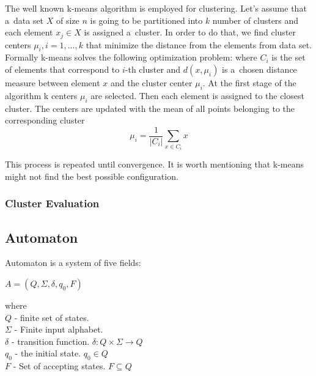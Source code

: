 \documentclass{article}
\begin{document}
The well known k-means algorithm is employed for clustering. Let's assume that a~data set $X$ of size $n$ is going to be partitioned into $k$ number of clusters and each element $x_{j}\in X$ is assigned a~cluster. In order to do that, we find cluster centers $\mu_{i}, i=1,\ldots,k$ that minimize the distance from the elements from data set. Formally k-means solves the following optimization problem:
where $C_{i}$ is the set of elements that correspond to $i$-th cluster and $d(x,\mu_{i})$ is a~chosen distance measure between element $x$ and the cluster center $\mu_{i}$. At the first stage of the algorithm k centers $\mu_{i}$ are selected. Then each element is assigned to the closest cluster. The centers are updated with the mean of all points belonging to the corresponding cluster
\begin{equation}
  \mu_{i} = \frac{1}{|C_{i}|} \sum_{x\in C_{i}} x
\end{equation}

This process is repeated until convergence. It is worth mentioning that k-means might not find the best possible 
configuration.


\subsubsection{Cluster Evaluation}

\subsection{Automaton} \label{sec:autom}
Automaton is a system of five fields:
\begin{center}
	$A = (Q, \Sigma, \delta, q_0, F)$
\end{center}

where \\
$Q$ - finite set of states. \\
$\Sigma$ - Finite input alphabet. \\
$\delta$ - transition function. $\delta: Q \times \Sigma \rightarrow Q$ \\
$q_0$ - the initial state. $q_0 \in Q$ \\
$F$ - Set of accepting states. $F \subseteq Q$ \\
\end{document}
